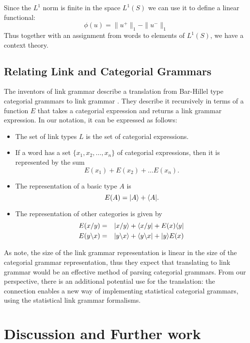 Since the $L^1$ norm is finite in the space $L^1(S)$ we can use it to define a linear functional:
$$\phi(u) = \|u^+\|_1 - \|u^-\|_1$$
Thus together with an assignment from words to elements of $L^1(S)$, we have a context theory.

\subsection{Relating Link and Categorial Grammars}

The inventors of link grammar describe a translation from Bar-Hillel type categorial grammars to link grammar \citep{Sleator:93}. They describe it recursively in terms of a function $E$ that takes a categorial expression and returns a link grammar expression. In our notation, it can be expressed as follows:
\begin{itemize}
\item The set of link types $L$ is the set of categorial expressions.
\item If a word has a set $\{x_1,x_2,\dots,x_n\}$ of categorial expressions, then it is represented by the sum
$$E(x_1)+E(x_2)+\ldots E(x_n).$$
\item The representation of a basic type $A$ is
$$E(A) = |A \rangle + \langle A|.$$
\item The representation of other categories is given by
\begin{eqnarray*}
E(x/y) &=& |x/y \rangle + \langle x/y| + E(x)\langle y|\\
E(y\backslash x) &=& |y\backslash x \rangle + \langle y\backslash x| + |y \rangle E(x)
\end{eqnarray*}
\end{itemize}
As \citeauthor{Sleator:93} note, the size of the link grammar representation is linear in the size of the categorial grammar representation, thus they expect that translating to link grammar would be an effective method of parsing categorial grammars. From our perspective, there is an additional potential use for the translation: the connection enables a new way of implementing statistical categorial grammars, using the statistical link grammar formalisms.


\section{Discussion and Further work}
\label{discussion-syntax-section}

